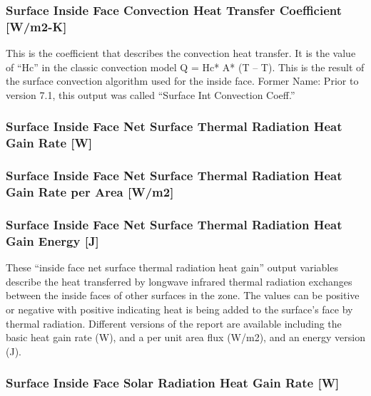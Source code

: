 \subsubsection{Surface Inside Face Convection Heat Transfer Coefficient {[}W/m2-K{]}}\label{surface-inside-face-convection-heat-transfer-coefficient-wm2-k}

This is the coefficient that describes the convection heat transfer. It is the value of ``Hc'' in the classic convection model Q = Hc* A* (T -- T). This is the result of the surface convection algorithm used for the inside face. Former Name: Prior to version 7.1, this output was called ``Surface Int Convection Coeff.''

\subsubsection{Surface Inside Face Net Surface Thermal Radiation Heat Gain Rate {[}W{]}}\label{surface-inside-face-net-surface-thermal-radiation-heat-gain-rate-w}

\subsubsection{Surface Inside Face Net Surface Thermal Radiation Heat Gain Rate per Area {[}W/m2{]}}\label{surface-inside-face-net-surface-thermal-radiation-heat-gain-rate-per-area-wm2}

\subsubsection{Surface Inside Face Net Surface Thermal Radiation Heat Gain Energy {[}J{]}}\label{surface-inside-face-net-surface-thermal-radiation-heat-gain-energy-j}

These ``inside face net surface thermal radiation heat gain'' output variables describe the heat transferred by longwave infrared thermal radiation exchanges between the inside faces of other surfaces in the zone. The values can be positive or negative with positive indicating heat is being added to the surface's face by thermal radiation. Different versions of the report are available including the basic heat gain rate (W), and a per unit area flux (W/m2), and an energy version (J).

\subsubsection{Surface Inside Face Solar Radiation Heat Gain Rate {[}W{]}}\label{surface-inside-face-solar-radiation-heat-gain-rate-w}


